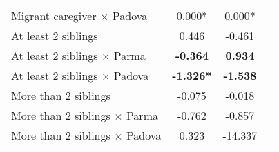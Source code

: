 \begin{tabular}{l c c c}
Migrant caregiver $\times$ Padova & 0.000* & 0.000* \\
At least 2 siblings &     0.446 &    -0.461 \\
At least 2 siblings $\times$ Parma & \textbf{   -0.364} & \textbf{    0.934} \\
At least 2 siblings $\times$ Padova & \textbf{-1.326*} & \textbf{   -1.538} \\
More than 2 siblings &    -0.075 &    -0.018 \\
More than 2 siblings $\times$ Parma &    -0.762 &    -0.857 \\
More than 2 siblings $\times$ Padova &     0.323 &   -14.337 \\
\bottomrule
\end{tabular}
